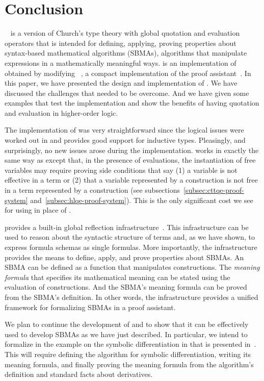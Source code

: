 \documentclass[fleqn]{llncs}
\begin{document}
\section{Conclusion}\label{sec:conclusion}

{\churchqe}~\cite{Farmer16,Farmer18} is a version of Church's
type theory with global quotation and evaluation operators that is
intended for defining, applying, proving properties about syntax-based
mathematical algorithms (SBMAs), algorithms that manipulate
expressions in a mathematically meaningful ways.  {\HLQE} is an
implementation of {\churchqe} obtained by modifying
{\HL}~\cite{Harrison09}, a compact implementation of the {\HOL} proof
assistant~\cite{GordonMelham93}.  In this paper, we have presented the
design and implementation of {\HLQE}.  We have discussed the
challenges that needed to be overcome.  And we have given some
examples that test the implementation and show the benefits of having
quotation and evaluation in higher-order logic.

The implementation of {\HLQE} was very straightforward since the
logical issues were worked out in {\churchqe} and {\HL} provides good
support for inductive types.  Pleasingly, and surprisingly, no new
issues arose during the implementation. {\HLQE} works in exactly the
same way as {\HL} except that, in the presence of evaluations, the 
instantiation of free variables may require proving side conditions 
that say (1) a variable is not effective in a term or (2) that a variable
represented by a construction is not free in a term represented by a
construction (see subsections~\ref{subsec:cttqe-proof-system}
and~\ref{subsec:hlqe-proof-system}).  This is the only significant
cost we see for using {\HLQE} in place of {\HL}.

{\HLQE} provides a built-in global reflection
infrastructure~\cite{Farmer18}.  This infrastructure can be used
to reason about the syntactic structure of terms and, as we have
shown, to express formula schemas as single formulas.  More
importantly, the infrastructure provides the means to define, apply,
and prove properties about SBMAs.  An SBMA can be defined as a
function that manipulates constructions.  The \emph{meaning formula}
that specifies its mathematical meaning can be stated using the
evaluation of constructions.  And the SBMA's meaning formula can be
proved from the SBMA's definition. In other words, the infrastructure
provides a unified framework for formalizing SBMAs in a proof
assistant.

We plan to continue the development of {\HLQE} and to show that it can
be effectively used to develop SBMAs as we have just described.  In
particular, we intend to formalize in {\HLQE} the example on the
symbolic differentiation in {\churchqe} that is presented
in~\cite{Farmer18}.  This will require defining the algorithm for
symbolic differentiation, writing its meaning formula, and finally
proving the meaning formula from the algorithm's definition and
standard facts about derivatives.




\end{document}
